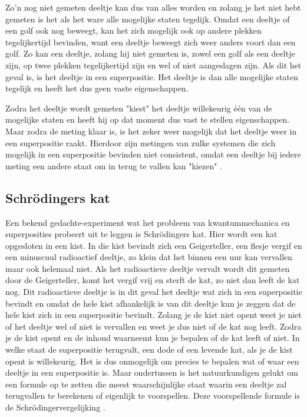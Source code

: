 \documentclass[11pt,fleqn]{book} %
\begin{document}
Zo'n nog niet gemeten deeltje kan dus van alles worden en zolang je het niet hebt gemeten is het als het ware alle mogelijke staten tegelijk. Omdat een deeltje of een golf ook nog beweegt, kan het zich mogelijk ook op andere plekken tegelijkertijd bevinden, want een deeltje beweegt zich weer anders voort dan een golf. Zo kan een deeltje, zolang hij niet gemeten is, zowel een golf als een deeltje zijn, op twee plekken tegelijkertijd zijn en wel of niet aangeslagen zijn. Als dit het geval is, is het deeltje in een superpositie. Het deeltje is dan alle mogelijke staten tegelijk en heeft het dus geen vaste eigenschappen.

Zodra het deeltje wordt gemeten "kiest" het deeltje willekeurig één van de mogelijke staten en heeft hij op dat moment dus vast te stellen eigenschappen. Maar zodra de meting klaar is, is het zeker weer mogelijk dat het deeltje weer in een superpositie raakt. Hierdoor zijn metingen van zulke systemen die zich mogelijk in een superpositie bevinden niet consistent, omdat een deeltje bij iedere meting een andere staat om in terug te vallen kan "kiezen" \cite{kopenhagen}\cite{superposition}.

\subsection{Schrödingers kat}
Een bekend gedachte-experiment wat het probleem van kwantummechanica en superposities probeert uit te leggen is Schrödingers kat. Hier wordt een kat opgesloten in een kist. In die kist bevindt zich een Geigerteller, een flesje vergif en een minuscuul radioactief deeltje, zo klein dat het binnen een uur kan vervallen maar ook helemaal niet. Als het radioactieve deeltje vervalt wordt dit gemeten door de Geigerteller, komt het vergif vrij en sterft de kat, zo niet dan leeft de kat nog. Dit radioactieve deeltje is in dit geval het deeltje wat zich in een superpositie bevindt en omdat de hele kist afhankelijk is van dit deeltje kun je zeggen dat de hele kist zich in een superpositie bevindt. Zolang je de kist niet opent weet je niet of het deeltje wel of niet is vervallen en weet je dus niet of de kat nog leeft. Zodra je de kist opent en de inhoud waarneemt kun je bepalen of de kat leeft of niet. In welke staat de superpositie terugvalt, een dode of een levende kat, als je de kist opent is willekeurig.
Het is dus onmogelijk om precies te bepalen wat of waar een deeltje in een superpositie is. Maar ondertussen is het natuurkundigen gelukt om een formule op te zetten die meest waarschijnlijke staat waarin een deeltje zal terugvallen te berekenen of eigenlijk te voorspellen. Deze voorspellende formule is de Schrödingervergelijking \cite{schrcat}.
\end{document}
